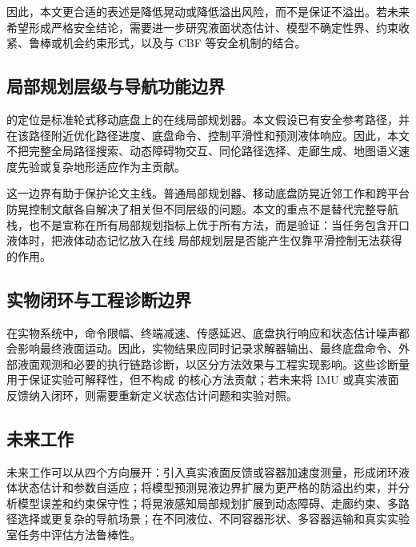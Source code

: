 因此，本文更合适的表述是降低晃动或降低溢出风险，而不是保证不溢出。若未来希望形成严格安全结论，需要进一步研究液面状态估计、模型不确定性界、约束收紧、鲁棒或机会约束形式，以及与 CBF 等安全机制的结合。

\subsection{局部规划层级与导航功能边界}

\SPMPC{} 的定位是标准轮式移动底盘上的在线局部规划器。本文假设已有安全参考路径，并在该路径附近优化路径进度、底盘命令、控制平滑性和预测液体响应。因此，本文不把完整全局路径搜索、动态障碍物交互、同伦路径选择、走廊生成、地图语义速度先验或复杂地形适应作为主贡献。

这一边界有助于保护论文主线。普通局部规划器、移动底盘防晃近邻工作和跨平台防晃控制文献各自解决了相关但不同层级的问题。本文的重点不是替代完整导航栈，也不是宣称在所有局部规划指标上优于所有方法，而是验证：当任务包含开口液体时，把液体动态记忆放入在线 \MPCC{} 局部规划层是否能产生仅靠平滑控制无法获得的作用。

\subsection{实物闭环与工程诊断边界}

在实物系统中，命令限幅、终端减速、传感延迟、底盘执行响应和状态估计噪声都会影响最终液面运动。因此，实物结果应同时记录求解器输出、最终底盘命令、外部液面观测和必要的执行链路诊断，以区分方法效果与工程实现影响。这些诊断量用于保证实验可解释性，但不构成 \SPMPC{} 的核心方法贡献；若未来将 IMU 或真实液面反馈纳入闭环，则需要重新定义状态估计问题和实验对照。

\subsection{未来工作}

未来工作可以从四个方向展开：引入真实液面反馈或容器加速度测量，形成闭环液体状态估计和参数自适应；将模型预测晃液边界扩展为更严格的防溢出约束，并分析模型误差和约束保守性；将晃液感知局部规划扩展到动态障碍、走廊约束、多路径选择或更复杂的导航场景；在不同液位、不同容器形状、多容器运输和真实实验室任务中评估方法鲁棒性。
